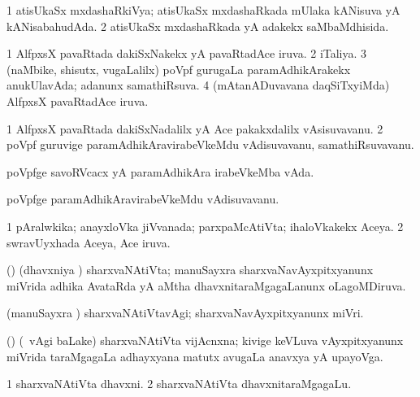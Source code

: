 \bentry
{} 
\gl{\gu}
\expl{}
\bmng
\bnum
\num{1} atisUkaSx mxdashaRkiVya; atisUkaSx mxdashaRkada mUlaka kANisuva yA kANisabahudAda. 
\num{2} atisUkaSx mxdashaRkada yA adakekx saMbaMdhisida. 
\enum
\emng
\eentry

\bentry
{} 
\gl{\gu}
\expl{}
\bmng
\bnum
\num{1} AlfpxsX pavaRtada dakiSxNakekx yA pavaRtadAce iruva. 
\num{2} iTaliya. 
\num{3} (naMbike, shisutx, \mo vugaLalilx) poVpf gurugaLa paramAdhikArakekx anukUlavAda; adanunx samathiRsuva. 
\num{4} (mAtanADuvavana daqSiTxyiMda) AlfpxsX pavaRtadAce iruva. 
\enum
\emng
\eentry

\bentry
{} 
\gl{\nA}
\expl{}
\bmng
\bnum
\num{1} AlfpxsX pavaRtada dakiSxNadalilx yA Ace pakakxdalilx vAsisuvavanu. 
\num{2} poVpf guruvige paramAdhikAravirabeVkeMdu vAdisuvavanu, samathiRsuvavanu. 
\enum
\emng
\eentry

\bentry
{} 
\gl{\nA}
\expl{}
\bmng
poVpfge savoRVcacx yA paramAdhikAra irabeVkeMba vAda. 
\emng
\eentry

\bentry
{} 
\gl{\nA}
\expl{}
\bmng
poVpfge paramAdhikAravirabeVkeMdu vAdisuvavanu. 
\emng
\eentry

\bentry
{} 
\gl{\gu}
\expl{}
\bmng
\bnum
\num{1} pAralwkika; anayxloVka jiVvanada; parxpaMcAtiVta; ihaloVkakekx Aceya. 
\num{2} swravUyxhada Aceya, Ace iruva. 
\enum
\emng
\eentry

\bentry
{} 
\gl{\gu}
\expl{}
\bmng
(\Bwvi) (dhavxniya \vi) sharxvaNAtiVta; manuSayxra sharxvaNavAyxpitxyanunx miVrida adhika AvataRda yA aMtha dhavxnitaraMgagaLanunx oLagoMDiruva. 
\emng
\eentry

\bentry
{} 
\gl{\kirxvi}
\expl{}
\bmng
(manuSayxra \vi) sharxvaNAtiVtavAgi; sharxvaNavAyxpitxyanunx miVri. 
\emng
\eentry

\bentry
{} 
\gl{\nA}
\expl{}
\bmng
(\bava) (\sA\ \Eva vAgi baLake) sharxvaNAtiVta vijAcnxna; kivige keVLuva vAyxpitxyanunx miVrida taraMgagaLa adhayxyana matutx avugaLa anavxya yA upayoVga. 
\emng
\eentry

\bentry
{} 
\gl{\nA}
\expl{}
\bmng
\bnum
\num{1} sharxvaNAtiVta dhavxni. 
\num{2} sharxvaNAtiVta dhavxnitaraMgagaLu. 
\enum
\emng
\eentry

